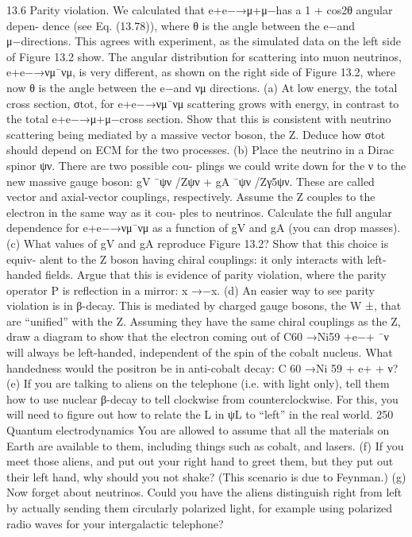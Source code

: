 13.6 Parity violation. We calculated that e+e−→μ+μ−has a 1 + cos2θ angular depen-
dence (see Eq. (13.78)), where θ is the angle between the e−and μ−directions.
This agrees with experiment, as the simulated data on the left side of Figure 13.2
show. The angular distribution for scattering into muon neutrinos, e+e−→νμ¯νμ, is
very different, as shown on the right side of Figure 13.2, where now θ is the angle
between the e−and νμ directions.
(a) At low energy, the total cross section, σtot, for e+e−→νμ¯νμ scattering grows
with energy, in contrast to the total e+e−→μ+μ−cross section. Show that this
is consistent with neutrino scattering being mediated by a massive vector boson,
the Z. Deduce how σtot should depend on ECM for the two processes.
(b) Place the neutrino in a Dirac spinor ψν. There are two possible cou-
plings we could write down for the ν to the new massive gauge boson:
gV ¯ψν /Zψν + gA ¯ψν /Zγ5ψν. These are called vector and axial-vector couplings,
respectively. Assume the Z couples to the electron in the same way as it cou-
ples to neutrinos. Calculate the full angular dependence for e+e−→νμ¯νμ as a
function of gV and gA (you can drop masses).
(c) What values of gV and gA reproduce Figure 13.2? Show that this choice is equiv-
alent to the Z boson having chiral couplings: it only interacts with left-handed
ﬁelds. Argue that this is evidence of parity violation, where the parity operator
P is reﬂection in a mirror: ⃗x →−⃗x.
(d) An easier way to see parity violation is in β-decay. This is mediated by charged
gauge bosons, the W ±, that are “uniﬁed” with the Z. Assuming they have the
same chiral couplings as the Z, draw a diagram to show that the electron coming
out of C60 →Ni59 +e−+ ¯ν will always be left-handed, independent of the spin
of the cobalt nucleus. What handedness would the positron be in anti-cobalt
decay: C
60 →Ni
59 + e+ + ν?
(e) If you are talking to aliens on the telephone (i.e. with light only), tell them how
to use nuclear β-decay to tell clockwise from counterclockwise. For this, you
will need to ﬁgure out how to relate the L in ψL to “left” in the real world.
250
Quantum electrodynamics
You are allowed to assume that all the materials on Earth are available to them,
including things such as cobalt, and lasers.
(f) If you meet those aliens, and put out your right hand to greet them, but they put
out their left hand, why should you not shake? (This scenario is due to Feynman.)
(g) Now forget about neutrinos. Could you have the aliens distinguish right from left
by actually sending them circularly polarized light, for example using polarized
radio waves for your intergalactic telephone?


